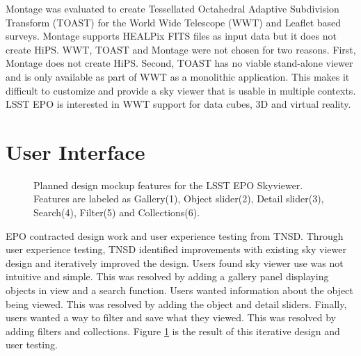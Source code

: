 \documentclass[11pt,twoside]{article}
\begin{document}
Montage \citep{2017PASP..129e8006B} was evaluated to create Tessellated Octahedral Adaptive Subdivision Transform (TOAST) for the World Wide Telescope (WWT) \citep{2012ASPC..461..267G} and Leaflet based surveys. Montage supports HEALPix FITS files as input data but it does not create HiPS. WWT, TOAST and Montage were not chosen for two reasons. First, Montage does not create HiPS. Second, TOAST has no viable stand-alone viewer and is only available as part of WWT as a monolithic application. This makes it difficult to customize and provide a sky viewer that is usable in multiple contexts. LSST EPO is interested in WWT support for data cubes, 3D and virtual reality.
\section{User Interface}
\begin{figure}[!ht]
  \caption{Planned design mockup features for the LSST EPO Skyviewer. Features are labeled as Gallery(1), Object slider(2), Detail slider(3), Search(4), Filter(5) and Collections(6).}
  \label{P1-140_fig1}
\end{figure}
\noindent EPO contracted design work and user experience testing from TNSD. Through user experience testing, TNSD identified improvements with existing sky viewer design and iteratively improved the design. Users found sky viewer use was not intuitive and simple. This was resolved by adding a gallery panel displaying objects in view and a search function. Users wanted information about the object being viewed. This was resolved by adding the object and detail sliders. Finally, users wanted a way to filter and save what they viewed. This was resolved by adding filters and collections. Figure \ref{P1-140_fig1} is the result of this iterative design and user testing.


\end{document}
